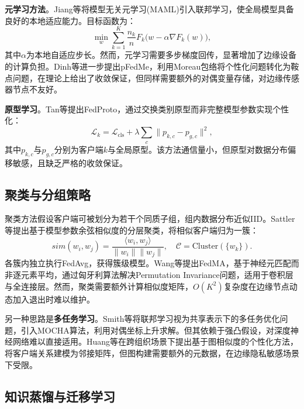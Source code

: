 \documentclass[a4paper,12pt]{article}
\begin{document}
\textbf{元学习方法}。Jiang等\cite{jiang2019improving}将模型无关元学习(MAML)引入联邦学习，使全局模型具备良好的本地适应能力。目标函数为：
\begin{equation}
\min_{w} \sum_{k=1}^{K} \frac{n_k}{n} F_k\big(w - \alpha \nabla F_k(w)\big),
\end{equation}
其中$\alpha$为本地自适应步长。然而，元学习需要多步梯度回传，显著增加了边缘设备的计算负担。Dinh等\cite{dinh2020personalized}进一步提出pFedMe，利用Moreau包络将个性化问题转化为鞍点问题，在理论上给出了收敛保证，但同样需要额外的对偶变量存储，对边缘传感器节点不友好。

\textbf{原型学习}。Tan等\cite{tan2022fedproto}提出FedProto，通过交换类别原型而非完整模型参数实现个性化：
\begin{equation}
\mathcal{L}_k = \mathcal{L}_{\text{cls}} + \lambda \sum_{c} \|p_{k,c} - p_{g,c}\|^2,
\end{equation}
其中$p_{k,c}$与$p_{g,c}$分别为客户端$k$与全局原型。该方法通信量小，但原型对数据分布偏移敏感，且缺乏严格的收敛保证。

\subsection{聚类与分组策略}

聚类方法假设客户端可被划分为若干个同质子组，组内数据分布近似IID。Sattler等\cite{sattler2019robust}提出基于模型参数余弦相似度的分层聚类，将相似客户端归为一簇：
\begin{equation}
sim(w_i, w_j) = \frac{\langle w_i, w_j \rangle}{\|w_i\| \|w_j\|}, \quad \mathcal{C} = \text{Cluster}(\{w_k\}).
\end{equation}
各簇内独立执行FedAvg，获得簇级模型。Wang等\cite{wang2020fedma}提出FedMA，基于神经元匹配而非逐元素平均，通过匈牙利算法解决Permutation Invariance问题，适用于卷积层与全连接层。然而，聚类需要额外计算相似度矩阵，$O(K^2)$复杂度在边缘节点动态加入退出时难以维护。

另一种思路是\textbf{多任务学习}。Smith等\cite{smith2017federated}将联邦学习视为共享表示下的多任务优化问题，引入MOCHA算法，利用对偶坐标上升求解。但其依赖于强凸假设，对深度神经网络难以直接适用。Huang等\cite{huang2021personalized}在跨组织场景下提出基于图相似度的个性化方法，将客户端关系建模为邻接矩阵，但图构建需要额外的元数据，在边缘隐私敏感场景下受限。

\subsection{知识蒸馏与迁移学习}
\end{document}
